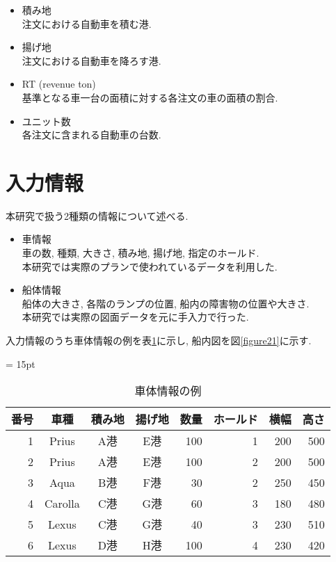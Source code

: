 \begin{itemize}
    \item 積み地 \\
    注文における自動車を積む港.

    \item 揚げ地 \\
    注文における自動車を降ろす港.

    \item  RT (revenue ton) \\
    基準となる車一台の面積に対する各注文の車の面積の割合. 

    \item ユニット数 \\
    各注文に含まれる自動車の台数.
\end{itemize}


\section{入力情報}
本研究で扱う2種類の情報について述べる. 

\begin{itemize}
    \item 車情報 \\
    車の数, 種類, 大きさ, 積み地, 揚げ地, 指定のホールド. \\
    本研究では実際のプランで使われているデータを利用した. 
    \item 船体情報 \\
    船体の大きさ, 各階のランプの位置, 船内の障害物の位置や大きさ. \\
    本研究では実際の図面データを元に手入力で行った. 

\end{itemize}
入力情報のうち車体情報の例を表\ref{table21}に示し, 船内図を図\ref{figure21}に示す. 

\begin{table}[htbp]
    \tabcolsep = 15pt
    \renewcommand{\arraystretch}{0.8}
    \caption{車体情報の例}
    \label{table21}
    \begin{center}
    \begin{tabular}{rcccrrrr} \hline
    番号 & 車種 & 積み地 & 揚げ地 & 数量 & ホールド & 横幅 & 高さ \\ \hline
    1 & Prius & A港 & E港 & 100 & 1 & 200 & 500 \\
    2 & Prius & A港 & E港 & 100 & 2 & 200 & 500 \\
    3 & Aqua & B港 & F港 & 30 & 2 & 250 & 450 \\
    4 & Carolla & C港 & G港 & 60 & 3 & 180 & 480 \\
    5 & Lexus & C港 & G港 & 40 & 3 & 230 & 510 \\
    6 & Lexus & D港 & H港 & 100 & 4 & 230 & 420 \\
    \hline
    \end{tabular}
    \end{center}
    \end{table}

